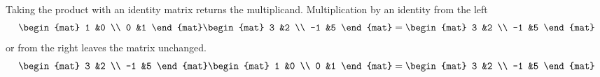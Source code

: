 \begin{frame}
\df[df:MainDiagonal]
\pause
\df[df:IdentityMatrix]
\pause
Taking the product with an identity matrix returns the multiplicand. 
\ex
Multiplication by an identity from the left
\begin{equation*}
  \begin{mat}
    1  &0 \\
    0  &1
  \end{mat}
  \begin{mat}
    3  &2  \\
   -1  &5
  \end{mat}
  =
  \begin{mat}
    3  &2  \\
   -1  &5
  \end{mat}
\end{equation*}
or from the right leaves the matrix unchanged.
\begin{equation*}
  \begin{mat}
    3  &2  \\
   -1  &5
  \end{mat}
  \begin{mat}
    1  &0 \\
    0  &1
  \end{mat}
  =
  \begin{mat}
    3  &2  \\
   -1  &5
  \end{mat}
\end{equation*}
\end{frame}




